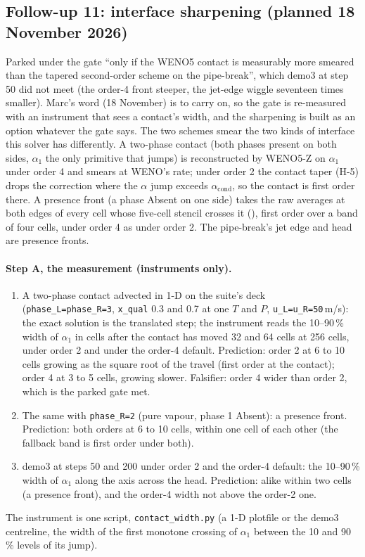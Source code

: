 \documentclass[11pt,a4paper]{article}
\newcommand{\code}[1]{\texttt{\small #1}}
\begin{document}
\subsection*{Follow-up 11: interface sharpening (planned 18 November 2026)}

Parked under the gate ``only if the WENO5 contact is measurably more
smeared than the tapered second-order scheme on the pipe-break'', which
demo3 at step 50 did not meet (the order-4 front steeper, the jet-edge
wiggle seventeen times smaller).  Marc's word (18 November) is to carry
on, so the gate is re-measured with an instrument that sees a contact's
width, and the sharpening is built as an option whatever the gate says.
The two schemes smear the two kinds of interface this solver has
differently.  A two-phase contact (both phases present on both sides,
$\alpha_1$ the only primitive that jumps) is reconstructed by WENO5-Z on
$\alpha_1$ under order 4 and smears at WENO's rate; under order 2 the
contact taper (H-5) drops the correction where the $\alpha$ jump exceeds
$\alpha_{\mathrm{cond}}$, so the contact is first order there.  A
presence front (a phase Absent on one side) takes the raw averages at
both edges of every cell whose five-cell stencil crosses it
(), first order over a band of four cells, under order 4
as under order 2.  The pipe-break's jet edge and head are presence
fronts.

\paragraph{Step A, the measurement (instruments only).}
\begin{enumerate}[nosep]
\item A two-phase contact advected in 1-D on the suite's deck
      (\code{phase\_L=phase\_R=3}, \code{x\_qual} 0.3 and 0.7 at one $T$
      and $P$, \code{u\_L=u\_R=50}\,m/s): the exact solution is the
      translated step; the instrument reads the 10--90\,\% width of
      $\alpha_1$ in cells after the contact has moved 32 and 64 cells at
      256 cells, under order 2 and under the order-4 default.
      Prediction: order 2 at 6 to 10 cells growing as the square root of
      the travel (first order at the contact); order 4 at 3 to 5 cells,
      growing slower.  Falsifier: order 4 wider than order 2, which is
      the parked gate met.
\item The same with \code{phase\_R=2} (pure vapour, phase 1 Absent): a
      presence front.  Prediction: both orders at 6 to 10 cells, within
      one cell of each other (the fallback band is first order under
      both).
\item demo3 at steps 50 and 200 under order 2 and the order-4 default:
      the 10--90\,\% width of $\alpha_1$ along the axis across the head.
      Prediction: alike within two cells (a presence front), and the
      order-4 width not above the order-2 one.
\end{enumerate}
The instrument is one script, \code{contact\_width.py} (a 1-D plotfile
or the demo3 centreline, the width of the first monotone crossing of
$\alpha_1$ between the 10 and 90\,\% levels of its jump).
\end{document}
